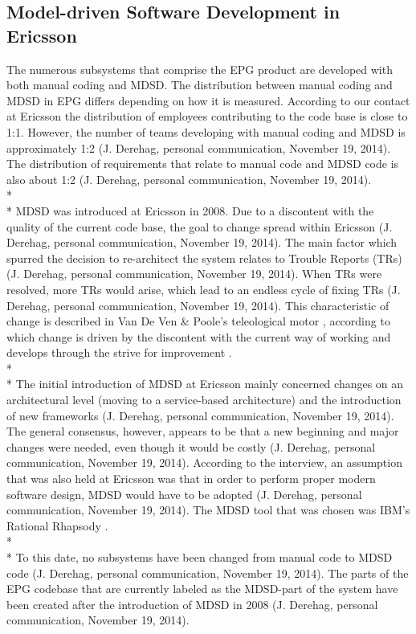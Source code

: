 \documentclass[final_report_innit.tex]{subfiles}
\begin{document}
\subsection{Model-driven Software Development in Ericsson}
The numerous subsystems that comprise the EPG product are developed with both manual coding and MDSD. The distribution between manual coding and MDSD in EPG differs depending on how it is measured. According to our contact at Ericsson the distribution of employees contributing to the code base is close to 1:1. However, the number of teams developing with manual coding and MDSD is approximately 1:2 (J. Derehag, personal communication, November 19, 2014). The distribution of requirements that relate to manual code and MDSD code is also about 1:2 (J. Derehag, personal communication, November 19, 2014).
\\* 
\\* 
MDSD was introduced at Ericsson in 2008. Due to a discontent with the quality of the current code base, the goal to change spread within Ericsson (J. Derehag, personal communication, November 19, 2014). The main factor which spurred the decision to re-architect the system relates to Trouble Reports (TRs) (J. Derehag, personal communication, November 19, 2014). When TRs were resolved, more TRs would arise, which lead to an endless cycle of fixing TRs (J. Derehag, personal communication, November 19, 2014). This characteristic of change is described in Van De Ven \& Poole’s teleological motor \cite{van1995explaining}, according to which change is driven by the discontent with the current way of working and develops through the strive for improvement \cite{van1995explaining}. 
\\* 
\\* 
The initial introduction of MDSD at Ericsson mainly concerned changes on an architectural level (moving to a service-based architecture) and the introduction of new frameworks (J. Derehag, personal communication, November 19, 2014). The general consensus, however, appears to be that a new beginning and major changes were needed, even though it would be costly (J. Derehag, personal communication, November 19, 2014). According to the interview, an assumption that was also held at Ericsson was that in order to perform proper modern software design, MDSD would have to be adopted (J. Derehag, personal communication, November 19, 2014). The MDSD tool that was chosen was IBM’s Rational Rhapsody \cite{rrf}.
\\* 
\\* 
To this date, no subsystems have been changed from manual code to MDSD code (J. Derehag, personal communication, November 19, 2014). The parts of the EPG codebase that are currently labeled as the MDSD-part of the system have been created after the introduction of MDSD in 2008 (J. Derehag, personal communication, November 19, 2014). 
\end{document}
